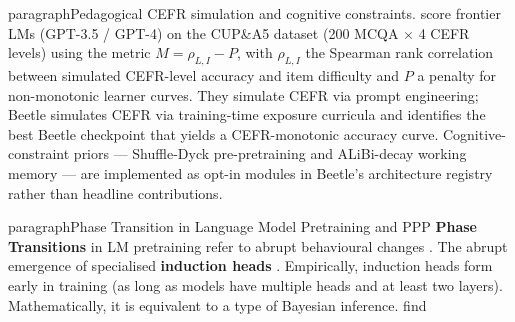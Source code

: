 paragraph{Pedagogical CEFR simulation and cognitive constraints.} \citet{benedetto-etal-2024-using} score frontier LMs (GPT-3.5 / GPT-4) on the CUP\&A5 dataset \citep{mullooly2023cupa5} (200 MCQA $\times$ 4 CEFR levels) using the metric $M = \rho_{L,I} - P$, with $\rho_{L,I}$ the Spearman rank correlation between simulated CEFR-level accuracy and item difficulty and $P$ a penalty for non-monotonic learner curves. They simulate CEFR via prompt engineering; Beetle simulates CEFR via training-time exposure curricula and identifies the best Beetle checkpoint that yields a CEFR-monotonic accuracy curve. Cognitive-constraint priors --- Shuffle-Dyck pre-pretraining \citep{hu2025between} and ALiBi-decay working memory \citep{mita2025wm, madhayastha2026wm} --- are implemented as opt-in modules in Beetle's architecture registry rather than headline contributions.


paragraph{Phase Transition in Language Model Pretraining and PPP } \textbf{Phase Transitions } in LM pretraining refer to abrupt behavioural changes \citep{oh2023does, michaelov2025language, chang2025bigram, nakagi2025triple}.  The abrupt emergence of specialised \textbf{induction heads} \citep{chensudden, aoyama2025predicting}. Empirically, induction heads form early in training (as long as models have multiple heads and at least two layers).  Mathematically, it is equivalent to a type of Bayesian inference. \citet{aoyama-wilcox-2025-language} find 






